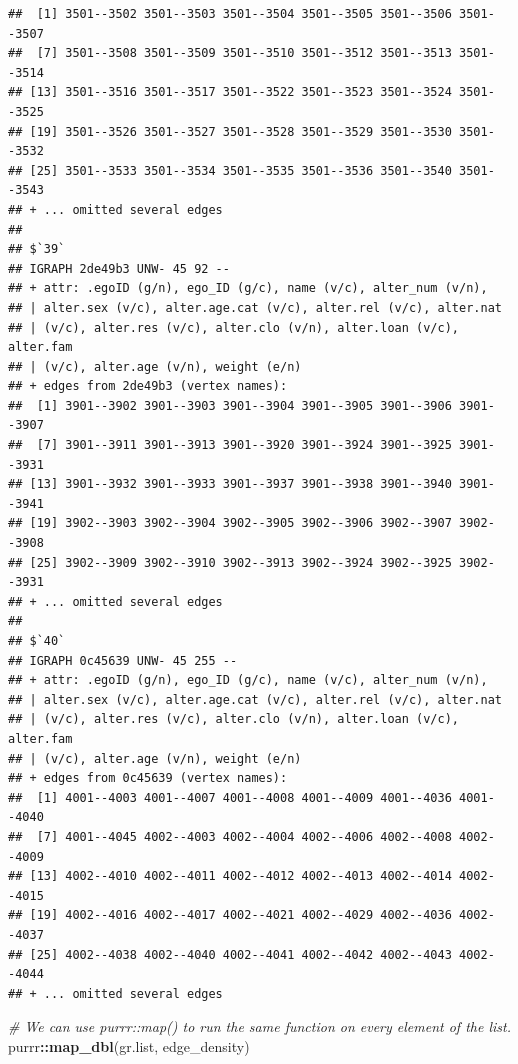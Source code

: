 \documentclass[
]{book}
\newenvironment{Shaded}{\begin{snugshade}}{\end{snugshade}}
\newcommand{\CommentTok}[1]{\textcolor[rgb]{0.56,0.35,0.01}{\textit{#1}}}
\newcommand{\FunctionTok}[1]{\textcolor[rgb]{0.13,0.29,0.53}{\textbf{#1}}}
\newcommand{\NormalTok}[1]{#1}
\newcommand{\SpecialCharTok}[1]{\textcolor[rgb]{0.81,0.36,0.00}{\textbf{#1}}}
\begin{document}
\begin{verbatim}
##  [1] 3501--3502 3501--3503 3501--3504 3501--3505 3501--3506 3501--3507
##  [7] 3501--3508 3501--3509 3501--3510 3501--3512 3501--3513 3501--3514
## [13] 3501--3516 3501--3517 3501--3522 3501--3523 3501--3524 3501--3525
## [19] 3501--3526 3501--3527 3501--3528 3501--3529 3501--3530 3501--3532
## [25] 3501--3533 3501--3534 3501--3535 3501--3536 3501--3540 3501--3543
## + ... omitted several edges
## 
## $`39`
## IGRAPH 2de49b3 UNW- 45 92 -- 
## + attr: .egoID (g/n), ego_ID (g/c), name (v/c), alter_num (v/n),
## | alter.sex (v/c), alter.age.cat (v/c), alter.rel (v/c), alter.nat
## | (v/c), alter.res (v/c), alter.clo (v/n), alter.loan (v/c), alter.fam
## | (v/c), alter.age (v/n), weight (e/n)
## + edges from 2de49b3 (vertex names):
##  [1] 3901--3902 3901--3903 3901--3904 3901--3905 3901--3906 3901--3907
##  [7] 3901--3911 3901--3913 3901--3920 3901--3924 3901--3925 3901--3931
## [13] 3901--3932 3901--3933 3901--3937 3901--3938 3901--3940 3901--3941
## [19] 3902--3903 3902--3904 3902--3905 3902--3906 3902--3907 3902--3908
## [25] 3902--3909 3902--3910 3902--3913 3902--3924 3902--3925 3902--3931
## + ... omitted several edges
## 
## $`40`
## IGRAPH 0c45639 UNW- 45 255 -- 
## + attr: .egoID (g/n), ego_ID (g/c), name (v/c), alter_num (v/n),
## | alter.sex (v/c), alter.age.cat (v/c), alter.rel (v/c), alter.nat
## | (v/c), alter.res (v/c), alter.clo (v/n), alter.loan (v/c), alter.fam
## | (v/c), alter.age (v/n), weight (e/n)
## + edges from 0c45639 (vertex names):
##  [1] 4001--4003 4001--4007 4001--4008 4001--4009 4001--4036 4001--4040
##  [7] 4001--4045 4002--4003 4002--4004 4002--4006 4002--4008 4002--4009
## [13] 4002--4010 4002--4011 4002--4012 4002--4013 4002--4014 4002--4015
## [19] 4002--4016 4002--4017 4002--4021 4002--4029 4002--4036 4002--4037
## [25] 4002--4038 4002--4040 4002--4041 4002--4042 4002--4043 4002--4044
## + ... omitted several edges
\end{verbatim}

\begin{Shaded}
\begin{Highlighting}[]
\CommentTok{\# We can use purrr::map() to run the same function on every element of the list.}
\NormalTok{purrr}\SpecialCharTok{::}\FunctionTok{map\_dbl}\NormalTok{(gr.list, edge\_density)}
\end{Highlighting}
\end{Shaded}
\end{document}
